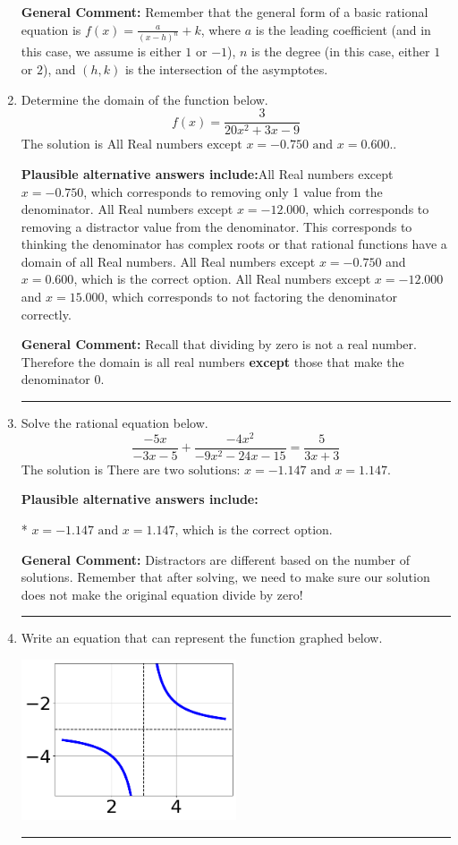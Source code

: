\documentclass{extbook}[14pt]
\newcommand{\litem}[1]{\item #1

\rule{\textwidth}{0.4pt}}
\begin{document}
\begin{enumerate}
{\textbf{General Comment:} Remember that the general form of a basic rational equation is $ f(x) = \frac{a}{(x-h)^n} + k$, where $a$ is the leading coefficient (and in this case, we assume is either $1$ or $-1$), $n$ is the degree (in this case, either $1$ or $2$), and $(h, k)$ is the intersection of the asymptotes.
}
\litem{
Determine the domain of the function below.
\[ f(x) = \frac{3}{20x^{2} +3 x -9} \]The solution is \( \text{All Real numbers except } x = -0.750 \text{ and } x = 0.600. \).\begin{enumerate}[label=\Alph*.]
\textbf{Plausible alternative answers include:}All Real numbers except $x = -0.750$, which corresponds to removing only 1 value from the denominator.
All Real numbers except $x = -12.000$, which corresponds to removing a distractor value from the denominator.
This corresponds to thinking the denominator has complex roots or that rational functions have a domain of all Real numbers.
All Real numbers except $x = -0.750$ and $x = 0.600$, which is the correct option.
All Real numbers except $x = -12.000$ and $x = 15.000$, which corresponds to not factoring the denominator correctly.
\end{enumerate}

\textbf{General Comment:} Recall that dividing by zero is not a real number. Therefore the domain is all real numbers \textbf{except} those that make the denominator 0.
}
\litem{
Solve the rational equation below.
\[ \frac{-5x}{-3x -5} + \frac{-4x^{2}}{-9x^{2} -24 x -15} = \frac{5}{3x + 3} \]The solution is \( \text{There are two solutions: } x = -1.147 \text{ and } x = 1.147 \).\begin{enumerate}[label=\Alph*.]
\textbf{Plausible alternative answers include:}

* $x = -1.147 \text{ and } x = 1.147$, which is the correct option.


\end{enumerate}

\textbf{General Comment:} Distractors are different based on the number of solutions. Remember that after solving, we need to make sure our solution does not make the original equation divide by zero!
}
\litem{
Write an equation that can represent the function graphed below.

\begin{center}
    \includegraphics[width=0.5\textwidth]{../Figures/rationalGraphToEquationCopyC.png}
\end{center}


}
\end{enumerate}
\end{document}
